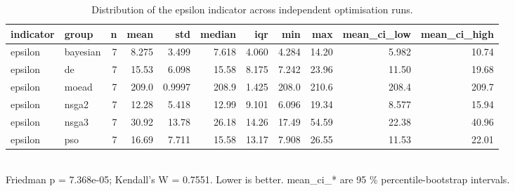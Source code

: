 \begin{table}[!t]
\centering
\caption{Distribution of the epsilon indicator across independent optimisation runs.}
\label{tab:statistics_optimizer_epsilon_main}
\footnotesize
\begin{tabular}{llrrrrrrrrr}
\toprule
indicator & group & n & mean & std & median & iqr & min & max & mean\_ci\_low & mean\_ci\_high \\
\midrule
epsilon & bayesian & 7 & 8.275 & 3.499 & 7.618 & 4.060 & 4.284 & 14.20 & 5.982 & 10.74 \\
epsilon & de & 7 & 15.53 & 6.098 & 15.58 & 8.175 & 7.242 & 23.96 & 11.50 & 19.68 \\
epsilon & moead & 7 & 209.0 & 0.9997 & 208.9 & 1.425 & 208.0 & 210.6 & 208.4 & 209.7 \\
epsilon & nsga2 & 7 & 12.28 & 5.418 & 12.99 & 9.101 & 6.096 & 19.34 & 8.577 & 15.94 \\
epsilon & nsga3 & 7 & 30.92 & 13.78 & 26.18 & 14.26 & 17.49 & 54.59 & 22.38 & 40.96 \\
epsilon & pso & 7 & 16.69 & 7.711 & 15.58 & 13.17 & 7.908 & 26.55 & 11.53 & 22.01 \\
\bottomrule
\end{tabular}
\\[2pt] \footnotesize Friedman p = 7.368e-05; Kendall's W = 0.7551. Lower is better. mean\_ci\_* are 95 \% percentile-bootstrap intervals.
\end{table}
